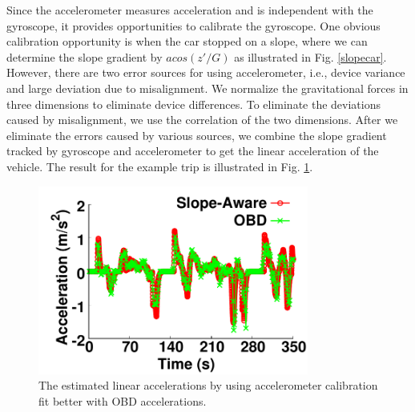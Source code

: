 Since the accelerometer measures acceleration and is independent 
with the gyroscope, it provides opportunities to calibrate the gyroscope.
One obvious calibration opportunity is when the 
car stopped on a slope, where we can determine
the slope gradient by $acos(z'/G)$ as illustrated in Fig. \ref{slopecar}.
However, there are two error sources for using accelerometer, 
i.e., device variance and large deviation due to misalignment.  
We normalize the gravitational forces in three dimensions
to eliminate device differences.
To eliminate the deviations caused by misalignment, 
we use the correlation of the two dimensions. 
After we eliminate the errors caused by various sources,
we combine the slope gradient tracked by gyroscope and 
accelerometer to get the linear acceleration of the vehicle. 
The result for the example trip is illustrated in Fig. \ref{linear}.

\begin{figure}[!htbp]
\begin{center}
\includegraphics[width=3.5in,angle=0]{Figs/SlopeAware/acccompare.pdf}
\vspace{0.0cm}
\caption{The estimated linear accelerations by using accelerometer calibration fit better with OBD accelerations.}
\label{linear}
\vspace{-0.3cm}
\end{center}
\end{figure}



